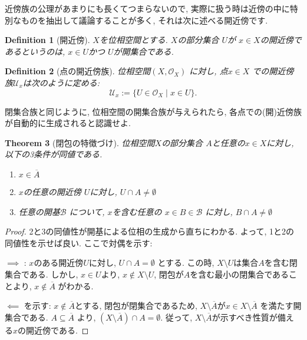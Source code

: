 \documentclass[lualatex]{ltjsbook}
\newcommand{\cl}[1]{\overline{ #1}  }
\newtheorem{theorem}{Theorem}[section]
\newtheorem{definition}[theorem]{Definition}
\theoremstyle{remark}
\theoremstyle{plain}
\begin{document}
近傍族の公理があまりにも長くてつまらないので, 実際に扱う時は近傍の中に特別なものを抽出して議論することが多く, それは次に述べる開近傍です.





\begin{definition}[開近傍]
	$X$を位相空間とする. $X$の部分集合 $U$が $x \in X$の開近傍であるというのは,  $ x \in U$かつ $U$が開集合である.
\end{definition}

\begin{definition}[点の開近傍族]
	位相空間$\left( X, \mathcal{O}_X \right) $ に対し, 点$x \in X$ での開近傍族$\mathcal{U}_x$は次のように定める:
	\[
	\mathcal{U}_x := \{U \in \mathcal{O}_X \mid x \in U\} 
	.\] 
\end{definition}


閉集合族と同じように, 位相空間の開集合族が与えられたら, 各点での(開)近傍族が自動的に生成されると認識せよ.

\begin{theorem}[閉包の特徴づけ]
	位相空間$X$の部分集合 $A$と任意の$x \in X$に対し, 以下の3条件が同値である.
	 \begin{enumerate}
		\item $x \in \cl{A}$
		\item  $x$の任意の開近傍 $U$に対し,  $U\cap A \neq \emptyset$
		\item  任意の開基$\mathcal{B}$ について, $x$を含む任意の $ x \in B \in \mathcal{B}$ に対し, $B\cap A \neq \emptyset$
	\end{enumerate}
\end{theorem}


\begin{proof}
	2と3の同値性が開基による位相の生成から直ちにわかる. よって, 1と2の同値性を示せば良い.
ここで対偶を示す:

$\implies$ : $x$のある開近傍$U$に対し,  $U \cap A = \emptyset$ とする. 
この時,  $X \setminus U$は集合$A$を含む閉集合である. 
しかし,  $x \in U $より, $x \not\in X \setminus U$, 閉包が$A$を含む最小の閉集合であることより, $x \not\in \cl{A}$ がわかる.

$\impliedby$ を示す: $x \not\in \cl{A} $とする, 閉包が閉集合であるため, $X \setminus \cl{A}$が$x \in X \setminus \cl{A}$ を満たす開集合である. 
$A \subseteq \cl{A}$ より, $\left( X\setminus \cl{A} \right) \cap A = \emptyset$. 
従って, $X \setminus \cl{A}$が示すべき性質が備える$x$の開近傍である.
	
\end{proof}
\end{document}
